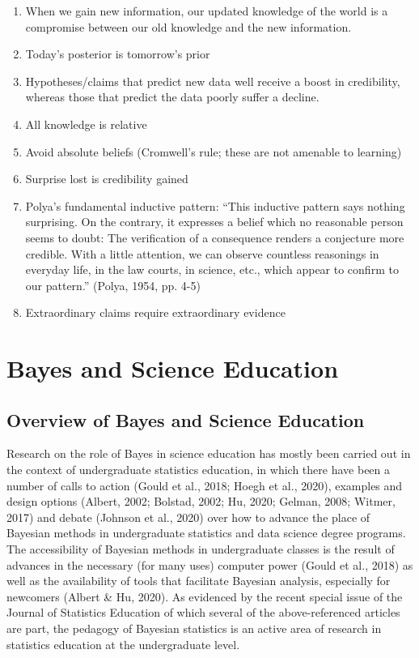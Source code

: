 \documentclass[man]{apa7}
\begin{document}
\begin{enumerate}
    \item When we gain new information, our updated knowledge of the world is a compromise between our old knowledge and the new information.
    \item Today’s posterior is tomorrow’s prior 
    \item Hypotheses/claims that predict new data well receive a boost in credibility, whereas those that predict the data poorly suffer a decline.
    \item All knowledge is relative
    \item Avoid absolute beliefs (Cromwell’s rule; these are not amenable to learning)
    \item Surprise lost is credibility gained
    \item Polya’s fundamental inductive pattern: “This inductive pattern says nothing surprising. On the contrary, it expresses a belief which no reasonable person seems to doubt: The verification of a consequence renders a conjecture more credible. With a little attention, we can observe countless reasonings in everyday life, in the law courts, in science, etc., which appear to confirm to our pattern.” (Polya, 1954, pp. 4-5)
    \item Extraordinary claims require extraordinary evidence
\end{enumerate}

\section{Bayes and Science Education}

\subsection{Overview of Bayes and Science Education}

Research on the role of Bayes in science education has mostly been carried out in the context of undergraduate statistics education, in which there have been a number of calls to action (Gould et al., 2018; Hoegh et al., 2020), examples and design options (Albert, 2002; Bolstad, 2002; Hu, 2020; Gelman, 2008; Witmer, 2017) and debate (Johnson et al., 2020) over how to advance the place of Bayesian methods in undergraduate statistics and data science degree programs. The accessibility of Bayesian methods in undergraduate classes is the result of advances in the necessary (for many uses) computer power (Gould et al., 2018) as well as the availability of tools that facilitate Bayesian analysis, especially for newcomers (Albert & Hu, 2020). As evidenced by the recent special issue of the Journal of Statistics Education of which several of the above-referenced articles are part, the pedagogy of Bayesian statistics is an active area of research in statistics education at the undergraduate level.
\end{document}
